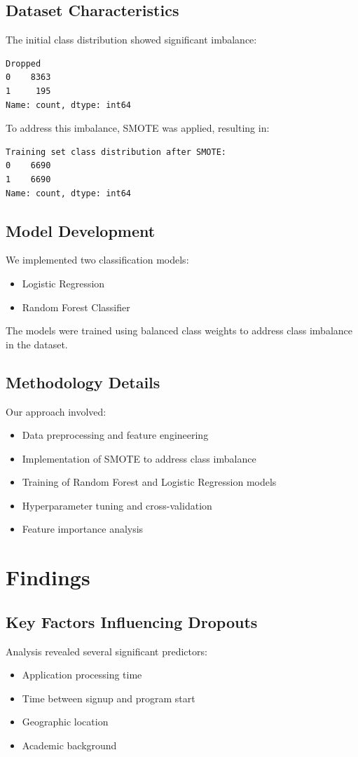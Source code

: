\documentclass[12pt,a4paper]{article}
\begin{document}
\subsection{Dataset Characteristics}
The initial class distribution showed significant imbalance:
\begin{verbatim}
Dropped
0    8363
1     195
Name: count, dtype: int64
\end{verbatim}

To address this imbalance, SMOTE was applied, resulting in:
\begin{verbatim}
Training set class distribution after SMOTE:
0    6690
1    6690
Name: count, dtype: int64
\end{verbatim}

\subsection{Model Development}
We implemented two classification models:
\begin{itemize}
    \item Logistic Regression
    \item Random Forest Classifier
\end{itemize}

The models were trained using balanced class weights to address class imbalance in the dataset.

\subsection{Methodology Details}
Our approach involved:
\begin{itemize}
    \item Data preprocessing and feature engineering
    \item Implementation of SMOTE to address class imbalance
    \item Training of Random Forest and Logistic Regression models
    \item Hyperparameter tuning and cross-validation
    \item Feature importance analysis
\end{itemize}

\section{Findings}
\subsection{Key Factors Influencing Dropouts}
Analysis revealed several significant predictors:
\begin{itemize}
    \item Application processing time
    \item Time between signup and program start
    \item Geographic location
    \item Academic background
\end{itemize}
\end{document}

